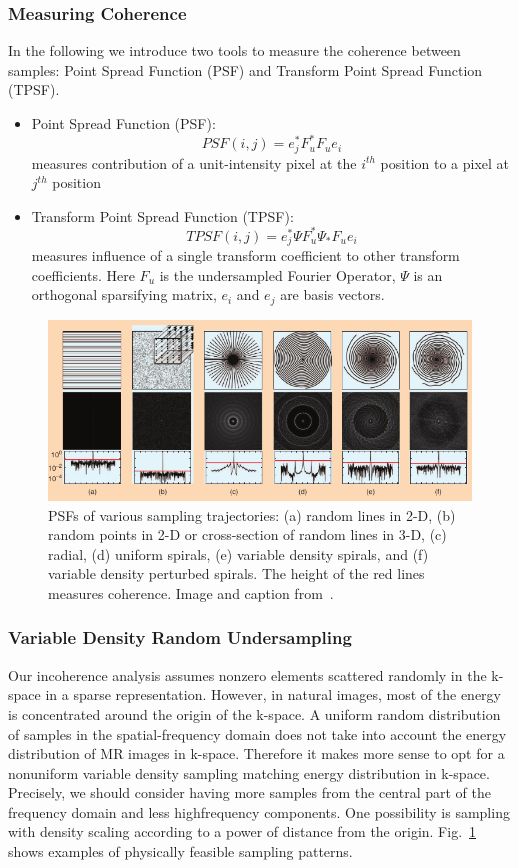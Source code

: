 \subsubsection{Measuring Coherence} 
In the following we introduce two tools to measure the coherence between samples: 
Point Spread Function (PSF) and Transform Point Spread Function (TPSF).
\begin{itemize}
    \item Point Spread Function (PSF):
    $$PSF(i,j)=e_{j}^{*}F_{u}^{*}F_{u}e_{i}$$
    measures contribution of a unit-intensity pixel at the $i^{th}$ position to a pixel at $j^{th}$ position  
    \item Transform Point Spread Function (TPSF):
    $$TPSF(i,j)=e_{j}^{*}\Psi F_{u}^{*}\Psi_{*} F_{u}e_{i}$$
    measures influence of a single transform
    coefficient to other transform coefficients. Here $F_{u}$ is the undersampled Fourier Operator, $\Psi$ is an orthogonal sparsifying matrix, $e_{i}$ and $e_{j}$ are basis vectors.
\end{itemize}
\begin{figure}
    \centering
    \includegraphics[width=\linewidth]{images/project with Wiem/non-cartesian-sampling.png}
    \caption{PSFs of various sampling trajectories: (a) random lines in 2-D, (b) random points in 2-D or cross-section of random lines in 3-D, (c) radial, (d) uniform spirals, (e) variable density spirals, and (f) variable density perturbed spirals. The height of the red lines measures coherence. Image and caption from~\cite{compressed}.}
    \label{fig:trajectories}
\end{figure}

\subsubsection{Variable Density Random Undersampling}
Our incoherence analysis assumes nonzero elements scattered randomly in the k-space in a sparse representation.  However, in natural images, most of the energy is concentrated around the origin of the k-space.
A uniform random distribution of samples in the spatial-frequency domain does not
take into account the energy distribution of MR images in k-space.   Therefore it makes more sense to opt for a nonuniform variable
density sampling matching energy distribution in k-space. Precisely, we should consider having more samples from the central part of the frequency domain and less highfrequency components. One possibility is sampling with density scaling according to a power of distance from the origin. Fig.~\ref{fig:trajectories} shows examples of physically feasible sampling patterns.

